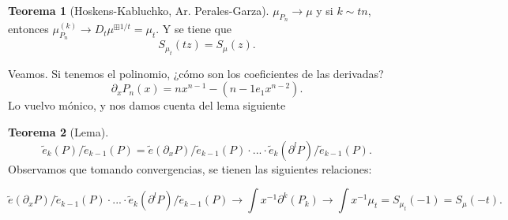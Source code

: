 \documentclass[letterpaper]{article}
\renewcommand{\to}{\rightarrow}
\newcommand{\1}{\mathds{1}}
\theoremstyle{definition}
\theoremstyle{definition}
\newtheorem{teo}{Teorema}
\theoremstyle{definition}
\theoremstyle{definition}
\theoremstyle{definition}
\begin{document}
\begin{teo}[Hoskens-Kabluchko, Ar. Perales-Garza]
 $\mu_{P_n}\to \mu$ y si $k\sim tn$, entonces $\mu_{P_n}^(k)\to D_t\mu^{\boxplus 1/t}=\mu_t$.
 Y se tiene que 
 \[
 S_{\mu_t}(tz)=S_\mu(z).
 \]
 \end{teo}
Veamos. Si tenemos el polinomio, ¿cómo son los coeficientes de las derivadas? 
\[
\partial_x P_n(x)=nx^{n-1}-(n-1e_1x^{n-2}).
\]
Lo vuelvo mónico, y nos damos cuenta del lema siguiente
\begin{teo}[Lema]
    \[
        \tilde{e}_k(P)/\tilde{e}_{k-1}(P)=\tilde{e}(\partial_xP)/\tilde{e}_{k-1}(P)\cdot...\cdot\tilde{e}_k(\partial^lP)/\tilde{e}_{k-1}(P).
    \]
    Observamos que tomando convergencias, se tienen las siguientes relaciones:

    \[
        \tilde{e}(\partial_xP)/\tilde{e}_{k-1}(P)\cdot...\cdot\tilde{e}_k(\partial^lP)/\tilde{e}_{k-1}(P)\to \int x^{-1}\partial^k(P_k)\to\int x^{-1}\mu_t=S_{\mu_t}(-1)=S_\mu(-t).
    \]
 \end{teo}
 
\end{document}

